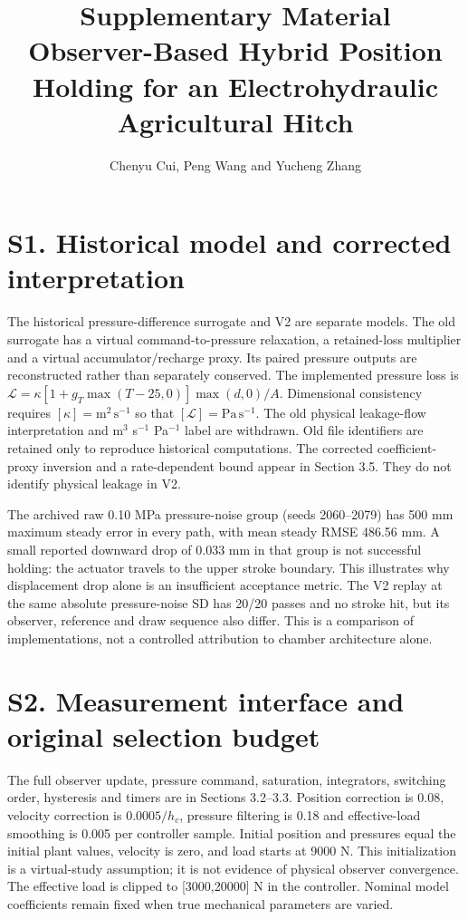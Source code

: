 \documentclass[11pt,a4paper]{article}
\title{Supplementary Material\\Observer-Based Hybrid Position Holding for an Electrohydraulic Agricultural Hitch}
\author{Chenyu Cui, Peng Wang and Yucheng Zhang}\date{}
\begin{document}
\maketitle
\section*{S1. Historical model and corrected interpretation}
The historical pressure-difference surrogate and V2 are separate models. The old surrogate has a virtual command-to-pressure relaxation, a retained-loss multiplier and a virtual accumulator/recharge proxy. Its paired pressure outputs are reconstructed rather than separately conserved. The implemented pressure loss is $\mathcal L=\kappa[1+g_T\max(T-25,0)]\max(d,0)/A$. Dimensional consistency requires $[\kappa]=\mathrm{m^2\,s^{-1}}$ so that $[\mathcal L]=\mathrm{Pa\,s^{-1}}$. The old physical leakage-flow interpretation and m$^3$ s$^{-1}$ Pa$^{-1}$ label are withdrawn. Old file identifiers are retained only to reproduce historical computations. The corrected coefficient-proxy inversion and a rate-dependent bound appear in Section 3.5. They do not identify physical leakage in V2.

The archived raw 0.10 MPa pressure-noise group (seeds 2060--2079) has 500 mm maximum steady error in every path, with mean steady RMSE 486.56 mm. A small reported downward drop of 0.033 mm in that group is not successful holding: the actuator travels to the upper stroke boundary. This illustrates why displacement drop alone is an insufficient acceptance metric. The V2 replay at the same absolute pressure-noise SD has 20/20 passes and no stroke hit, but its observer, reference and draw sequence also differ. This is a comparison of implementations, not a controlled attribution to chamber architecture alone.

\section*{S2. Measurement interface and original selection budget}
The full observer update, pressure command, saturation, integrators, switching order, hysteresis and timers are in Sections 3.2--3.3. Position correction is 0.08, velocity correction is $0.0005/h_c$, pressure filtering is 0.18 and effective-load smoothing is 0.005 per controller sample. Initial position and pressures equal the initial plant values, velocity is zero, and load starts at 9000 N. This initialization is a virtual-study assumption; it is not evidence of physical observer convergence. The effective load is clipped to [3000,20000] N in the controller. Nominal model coefficients remain fixed when true mechanical parameters are varied.
\end{document}
